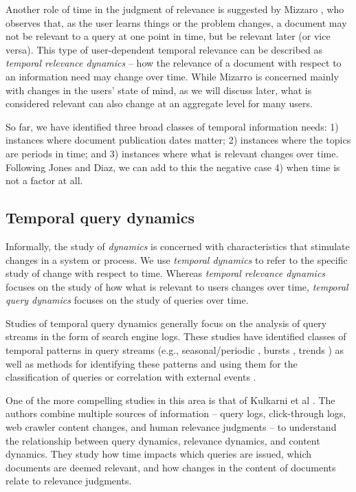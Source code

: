 \documentclass{sig-alternate}
\begin{document}
Another role of time in the judgment of relevance is suggested by Mizzaro \cite{Mizzaro1997}, who observes that, as the user learns things or the problem changes, a document may not be relevant to a query at one point in time, but be relevant later (or vice versa).  This type of user-dependent temporal relevance can be described as \emph{temporal relevance dynamics} -- how the relevance of a document with respect to an information need may change over time. While Mizarro is concerned mainly with changes in the users' state of mind, as we will discuss later, what is considered relevant can also change at an aggregate level for many users.

So far, we have identified three broad classes of temporal information needs: 1) instances where document publication dates matter; 2) instances where the topics are periods in time; and 3) instances where what is relevant changes over time. Following Jones and Diaz, we can add to this the negative case 4) when time is not a factor at all.

\subsection{Temporal query dynamics}

Informally, the study of \emph{dynamics} is concerned with characteristics that stimulate changes in a system or process. We use \emph{temporal dynamics} to refer to the specific study of change with respect to time. Whereas \emph{temporal relevance dynamics} focuses on the study of how what is relevant to users changes over time, \emph{temporal query dynamics} focuses on the study of queries over time. \cite{Kulkarni2011}

Studies of temporal query dynamics generally focus on the analysis of query streams in the form of search engine logs. These studies have identified classes of temporal patterns in query streams (e.g., seasonal/periodic \cite{Shokouhi2011}, bursts \cite{Vlachos2004}, trends \cite{Parikh2008}) as well as methods for identifying these patterns and using them for the classification of queries or correlation with external events \cite{Lavrenko2000,Vlachos2004}.

One of the more compelling studies in this area is that of Kulkarni et al \cite{Kulkarni2011}.  The authors combine multiple sources of information -- query logs, click-through logs, web crawler content changes, and human relevance judgments -- to understand the relationship between query dynamics, relevance dynamics, and content dynamics. They study how time impacts which queries are issued, which documents are deemed relevant, and how changes in the content of documents relate to relevance judgments.
\end{document}
